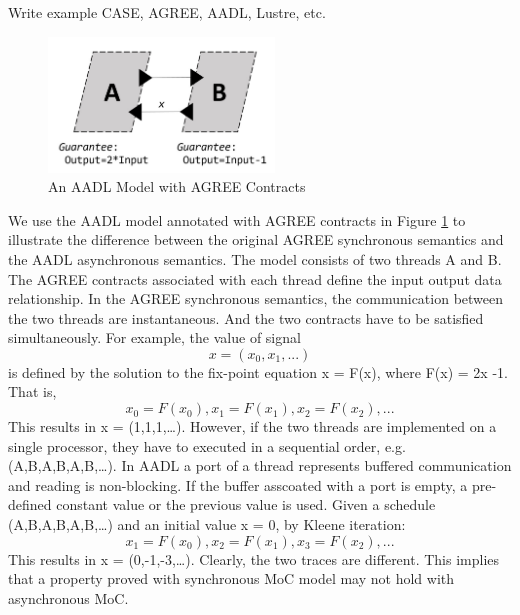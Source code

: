 Write example
CASE, AGREE, AADL, Lustre, etc.


\begin{figure}[ht!]
\centering
\includegraphics[width=60mm]{motivation.jpg}
\caption{An AADL Model with AGREE Contracts\label{motivation}}
\end{figure}

We use the AADL model annotated with AGREE contracts in Figure \ref{motivation} to illustrate the difference between the original AGREE synchronous semantics and the AADL asynchronous semantics. The model consists of two threads A and B. The AGREE contracts associated with each thread define the input output data relationship. In the AGREE synchronous semantics, the communication between the two threads are instantaneous. And the two contracts have to be satisfied simultaneously. For example, the value of signal \[x = (x_0, x_1, ...)\] is defined by the solution to the fix-point equation x = F(x), where F(x) = 2x -1. That is, \[x_0 = F(x_0), x_1 = F(x_1), x_2 = F(x_2), ...\] This results in x = (1,1,1,…). However, if the two threads are implemented on a single processor, they have to executed in a sequential order, e.g. (A,B,A,B,A,B,…). In AADL a port of a thread represents buffered communication and reading is non-blocking. If the buffer asscoated with a port is empty, a pre-defined constant value or the previous value is used. Given a schedule (A,B,A,B,A,B,…) and an initial value x = 0,  by Kleene iteration: \[x_1 = F(x_0), x_2 = F(x_1), x_3 = F(x_2),...\] This results in x = (0,-1,-3,…). Clearly, the two traces are different. This implies that a property proved with synchronous MoC model may not hold with asynchronous MoC.